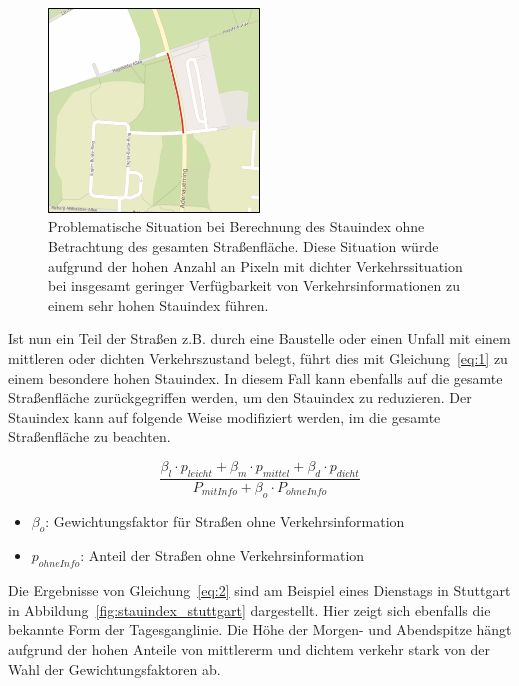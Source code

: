 \begin{figure}
  \centering
    \includegraphics[width=0.5\textwidth]{images/stauindex_problem.png}
    \caption{Problematische Situation bei Berechnung des Stauindex ohne Betrachtung des gesamten Straßenfläche. Diese Situation würde aufgrund der hohen Anzahl an Pixeln mit dichter Verkehrssituation bei insgesamt geringer Verfügbarkeit von Verkehrsinformationen zu einem sehr hohen Stauindex führen.}
    \label{fig:stauindex_problem}
\end{figure}

Ist nun ein Teil der Straßen z.B. durch eine Baustelle oder einen Unfall mit einem mittleren oder dichten Verkehrszustand belegt, führt dies mit Gleichung~\ref{eq:1} zu einem besondere hohen Stauindex. In diesem Fall kann ebenfalls auf die gesamte Straßenfläche zurückgegriffen werden, um den Stauindex zu reduzieren.
Der Stauindex kann auf folgende Weise modifiziert werden, im die gesamte Straßenfläche zu beachten.

\begin{equation}\label{eq:2}
\frac{\beta_l\cdot p_{leicht}+\beta_m\cdot p_{mittel}+\beta_d\cdot p_{dicht}}{P_{mit Info} + \beta_o\cdot P_{ohne Info}}
\end{equation}

\begin{itemize}
\item $\beta_o$: Gewichtungsfaktor für Straßen ohne Verkehrsinformation
\item $p_{ohne Info}$: Anteil der Straßen ohne Verkehrsinformation
\end{itemize}

Die Ergebnisse von Gleichung~\ref{eq:2} sind am Beispiel eines Dienstags in Stuttgart in Abbildung~\ref{fig:stauindex_stuttgart} dargestellt. Hier zeigt sich ebenfalls die bekannte Form der Tagesganglinie. Die Höhe der Morgen- und Abendspitze hängt aufgrund der hohen Anteile von mittlererm und dichtem verkehr stark von der Wahl der Gewichtungsfaktoren ab.\\

